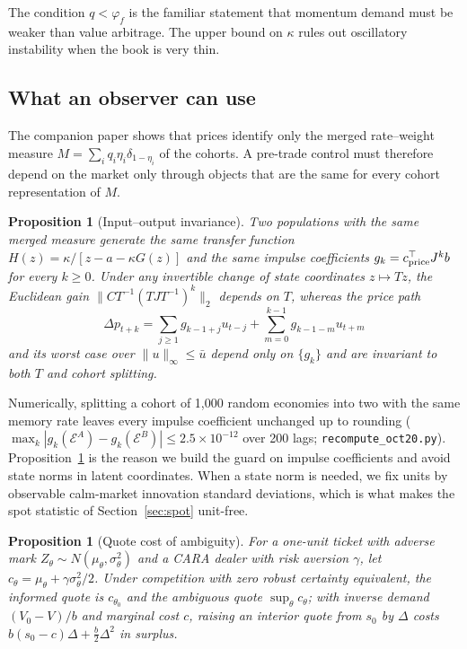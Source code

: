 \documentclass[12pt]{article}
\newtheorem{proposition}[theorem]{Proposition}
\theoremstyle{definition}
\theoremstyle{remark}
\begin{document}
The condition $q<\varphi_f$ is the familiar statement that momentum demand must be weaker than value arbitrage. The upper bound on $\kappa$ rules out oscillatory instability when the book is very thin.

\subsection{What an observer can use}

The companion paper shows that prices identify only the merged rate--weight measure $M=\sum_iq_i\eta_i\delta_{1-\eta_i}$ of the cohorts. A pre-trade control must therefore depend on the market only through objects that are the same for every cohort representation of $M$.

\begin{proposition}[Input--output invariance]\label{prop:invariance}
Two populations with the same merged measure generate the same transfer function $H(z)=\kappa/[z-a-\kappa G(z)]$ and the same impulse coefficients $g_k=c_{\rm price}^\top J^kb$ for every $k\ge0$. Under any invertible change of state coordinates $z\mapsto Tz$, the Euclidean gain $\|CT^{-1}(TJT^{-1})^k\|_2$ depends on $T$, whereas the price path
\[
\Delta p_{t+k}=\sum_{j\ge1}g_{k-1+j}u_{t-j}+\sum_{m=0}^{k-1}g_{k-1-m}u_{t+m}
\]
and its worst case over $\|u\|_\infty\le\bar u$ depend only on $\{g_k\}$ and are invariant to both $T$ and cohort splitting.
\end{proposition}

Numerically, splitting a cohort of 1{,}000 random economies into two with the same memory rate leaves every impulse coefficient unchanged up to rounding ($\max_k|g_k(\mathcal E^A)-g_k(\mathcal E^B)|\le2.5\times10^{-12}$ over 200 lags; \texttt{recompute\_oct20.py}). Proposition~\ref{prop:invariance} is the reason we build the guard on impulse coefficients and avoid state norms in latent coordinates. When a state norm is needed, we fix units by observable calm-market innovation standard deviations, which is what makes the spot statistic of Section~\ref{sec:spot} unit-free.

\begin{proposition}[Quote cost of ambiguity]\label{prop:ambig}
For a one-unit ticket with adverse mark $Z_\theta\sim N(\mu_\theta,\sigma_\theta^2)$ and a CARA dealer with risk aversion $\gamma$, let $c_\theta=\mu_\theta+\gamma\sigma_\theta^2/2$. Under competition with zero robust certainty equivalent, the informed quote is $c_{\theta_0}$ and the ambiguous quote $\sup_\theta c_\theta$; with inverse demand $(V_0-V)/b$ and marginal cost $c$, raising an interior quote from $s_0$ by $\Delta$ costs $b(s_0-c)\Delta+\tfrac b2\Delta^2$ in surplus.
\end{proposition}
\end{document}
